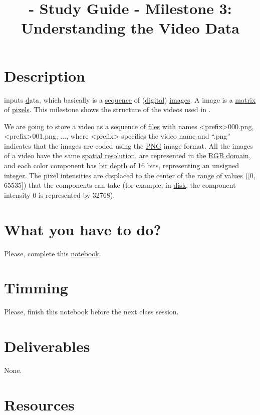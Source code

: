 
\title{\SM - Study Guide - Milestone 3: Understanding the Video Data}

\maketitle

\section{Description}

\theproject inputs \href{https://en.wikipedia.org/wiki/Video} data,
which basically is a
\href{https://en.wikipedia.org/wiki/Sequence}{sequence} of
(\href{https://en.wikipedia.org/wiki/Digital_data}{digital})
\href{https://en.wikipedia.org/wiki/Image}{images}. A image is a
\href{https://en.wikipedia.org/wiki/Matrix_(mathematics)}{matrix} of
\href{https://en.wikipedia.org/wiki/Pixel}{pixels}. This milestone
shows the structure of the videos used in \theproject.

We are going to store a video as a sequence of
\href{https://en.wikipedia.org/wiki/Computer_file}{files} with names
<prefix>000.png, <prefix>001.png, ..., where <prefix> specifies the
video name and ``.png'' indicates that the images are coded using the
\href{https://en.wikipedia.org/wiki/Portable_Network_Graphics}{PNG}
image format. All the images of a video have the same
\href{https://en.wikipedia.org/wiki/Image_resolution}{spatial
  resolution}, are represented in the
\href{https://en.wikipedia.org/wiki/RGB_color_model}{RGB domain}, and
each color component has
\href{https://en.wikipedia.org/wiki/Glossary_of_computer_graphics#bit_depth}{bit
  depth} of 16 bits, representing an unsigned
\href{https://en.wikipedia.org/wiki/Integer_(computer_science)}{integer}. The
pixel
\href{https://en.wikipedia.org/wiki/Luminous_intensity}{intensities}
are displaced to the center of the
\href{https://en.wikipedia.org/wiki/Range_(computer_programming)}{range
  of values} ([0, 65535]) that the components can take (for example,
in \href{https://en.wikipedia.org/wiki/Disk_storage}{disk}, the
component intensity 0 is represented by 32768).

\section{What you have to do?}


Please, complete this
\href{https://github.com/Sistemas-Multimedia/Sistemas-Multimedia.github.io/blob/master/study_guide/MDWT/MDWT.ipynb}{notebook}.

\section{Timming}

Please, finish this notebook before the next class session.

\section{Deliverables}

None.

\section{Resources}


